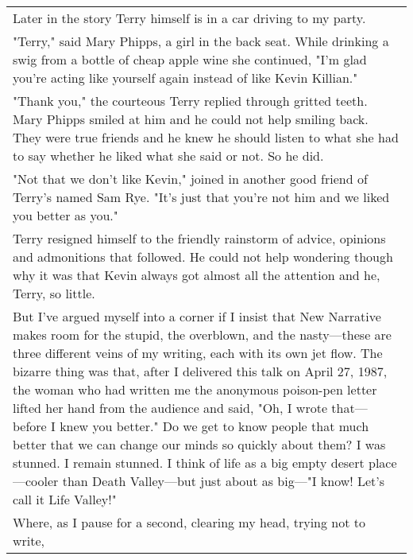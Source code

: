 \begin{longtable}[]{@{}l@{}}
\begin{minipage}[t]{0.97\columnwidth}
Later in the story Terry himself is in a car driving to my party.\strut
\end{minipage}\tabularnewline
\begin{minipage}[t]{0.97\columnwidth}\raggedright
"Terry," said Mary Phipps, a girl in the back seat. While drinking a
swig from a bottle of cheap apple wine she continued, "I'm glad you're
acting like yourself again instead of like Kevin Killian."\strut
\end{minipage}\tabularnewline
\begin{minipage}[t]{0.97\columnwidth}\raggedright
"Thank you," the courteous Terry replied through gritted teeth. Mary
Phipps smiled at him and he could not help smiling back. They were true
friends and he knew he should listen to what she had to say whether he
liked what she said or not. So he did.\strut
\end{minipage}\tabularnewline
\begin{minipage}[t]{0.97\columnwidth}\raggedright
"Not that we don't like Kevin," joined in another good friend of Terry's
named Sam Rye. "It's just that you're not him and we liked you better as
you."\strut
\end{minipage}\tabularnewline
\begin{minipage}[t]{0.97\columnwidth}\raggedright
Terry resigned himself to the friendly rainstorm of advice, opinions and
admonitions that followed. He could not help wondering though why it was
that Kevin always got almost all the attention and he, Terry, so
little.\strut
\end{minipage}\tabularnewline
\begin{minipage}[t]{0.97\columnwidth}\raggedright
But I've argued myself into a corner if I insist that New Narrative
makes room for the stupid, the overblown, and the nasty---these are
three different veins of my writing, each with its own jet flow. The
bizarre thing was that, after I delivered this talk on April 27, 1987,
the woman who had written me the anonymous poison-pen letter lifted her
hand from the audience and said, "Oh, I wrote that---before I knew you
better." Do we get to know people that much better that we can change
our minds so quickly about them? I was stunned. I remain stunned. I
think of life as a big empty desert place---cooler than Death
Valley---but just about as big---"I know! Let's call it Life
Valley!"\strut
\end{minipage}\tabularnewline
\begin{minipage}[t]{0.97\columnwidth}\raggedright
Where, as I pause for a second, clearing my head, trying not to write,

\end{minipage}
\end{longtable}
